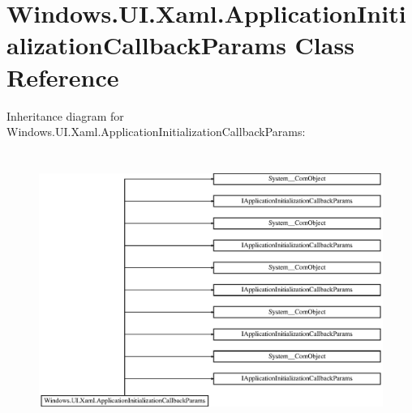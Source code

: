 \hypertarget{class_windows_1_1_u_i_1_1_xaml_1_1_application_initialization_callback_params}{}\section{Windows.\+U\+I.\+Xaml.\+Application\+Initialization\+Callback\+Params Class Reference}
\label{class_windows_1_1_u_i_1_1_xaml_1_1_application_initialization_callback_params}
Inheritance diagram for Windows.\+U\+I.\+Xaml.\+Application\+Initialization\+Callback\+Params\+:\begin{figure}[H]
\begin{center}
\leavevmode
\includegraphics[height=9.058824cm]{class_windows_1_1_u_i_1_1_xaml_1_1_application_initialization_callback_params}
\end{center}
\end{figure}
